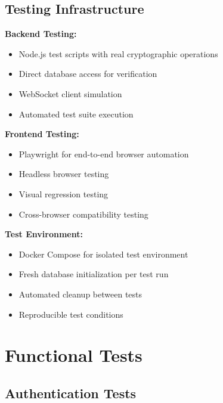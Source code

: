 \subsection{Testing Infrastructure}

\textbf{Backend Testing:}
\begin{itemize}
    \item Node.js test scripts with real cryptographic operations
    \item Direct database access for verification
    \item WebSocket client simulation
    \item Automated test suite execution
\end{itemize}

\textbf{Frontend Testing:}
\begin{itemize}
    \item Playwright for end-to-end browser automation
    \item Headless browser testing
    \item Visual regression testing
    \item Cross-browser compatibility testing
\end{itemize}

\textbf{Test Environment:}
\begin{itemize}
    \item Docker Compose for isolated test environment
    \item Fresh database initialization per test run
    \item Automated cleanup between tests
    \item Reproducible test conditions
\end{itemize}

\section{Functional Tests}

\subsection{Authentication Tests}

